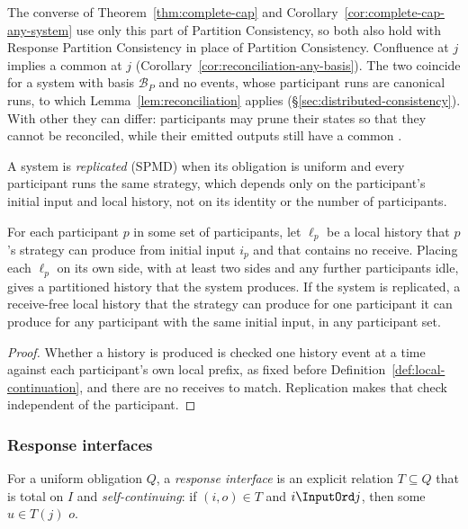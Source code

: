 The converse of Theorem~\ref{thm:complete-cap} and
Corollary~\ref{cor:complete-cap-any-system} use only this part of Partition
Consistency, so both also hold with Response Partition Consistency in place of
Partition Consistency.  Confluence at $j$ implies a common \outnoun at $j$
(Corollary~\ref{cor:reconciliation-any-basis}).  The two coincide for a system
with basis $\mathcal B_P$ and no \commitment events, whose participant runs
are canonical runs, to which Lemma~\ref{lem:reconciliation} applies
(\S\ref{sec:distributed-consistency}).  With other \commitments they can
differ: participants may prune their states so that they cannot be
reconciled, while their emitted outputs still have a common \outnoun.

A system is \emph{replicated} (SPMD) when its obligation is uniform and every
participant runs the same strategy, which depends only on the participant's
initial input and local history, not on its identity or the number of
participants.

\begin{lemma}[Locality]
\label{lem:locality}
For each participant $p$ in some set of participants, let $\ell_p$ be a local
history that $p$'s
strategy can produce from initial input $i_p$ and that contains no receive.
Placing each $\ell_p$ on its own side, with at least two sides and
any further participants
idle, gives a partitioned history that the system produces.  If the system is
replicated, a receive-free local history that the strategy can produce for one participant
it can produce for any participant with the same initial input, in any
participant set.
\end{lemma}

\begin{proof}
Whether a history is produced is checked one history event at a time against each
participant's own local prefix, as fixed before
Definition~\ref{def:local-continuation},
and there are no receives to match.
Replication makes that check independent of the participant.
\end{proof}

\subsubsection{Response interfaces}

\begin{definition}
\label{def:response-interface}
For a uniform obligation $Q$, a \emph{response interface} is an explicit
relation $T\subseteq Q$ that is total on $I$ and \emph{self-continuing}: if
$(i,o)\in T$ and $i\InputOrd j$, then some $u\in T(j)$ \outrel $o$.
\end{definition}

